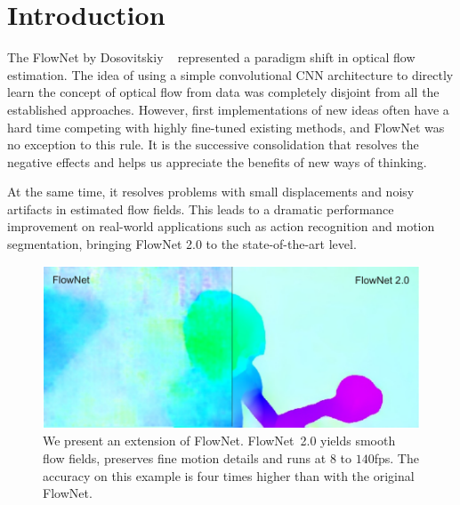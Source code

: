 \documentclass[10pt,twocolumn,letterpaper]{article}%
\begin{document}
\section{Introduction}
\label{sec:introduction}

The FlowNet by Dosovitskiy \etal~\cite{DFIB15} represented a paradigm shift in optical flow estimation. The idea of using a simple convolutional CNN architecture to directly learn the concept of optical flow from data was completely disjoint from all the established approaches. However, first implementations of new ideas often have a hard time competing with highly fine-tuned existing methods, and FlowNet was no exception to this rule. It is the successive consolidation that resolves the negative effects and helps us appreciate the benefits of new ways of thinking.

At the same time, it resolves problems with small displacements and noisy artifacts in estimated flow fields.
This leads to a dramatic performance improvement on real-world applications such as action recognition and motion segmentation, bringing FlowNet 2.0 to the state-of-the-art level.

\begin{figure}
  \begin{center}
    \includegraphics[width=\linewidth]{figures/teaser5.pdf}
  \end{center}
  \caption{We present an extension of FlowNet. FlowNet~2.0 yields smooth flow fields, preserves fine motion details and runs at $8$ to $140$fps. The accuracy on this example is four times higher than with the original FlowNet.} 
\label{fig:teaser}
\end{figure}
\end{document}
